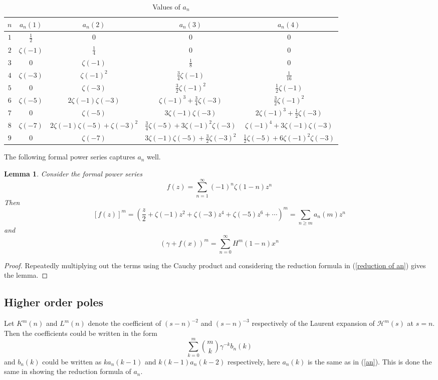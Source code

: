 \documentclass{article}
\newtheorem{lemma}[theorem]{Lemma}%
\begin{document}
\begin{table}[h]
\caption{Values of $a_n$}\vspace{3mm}\label{tab3}
\begin{tabular}{|c|c|c|c|c|} \hline 
    $n$ & $a_n(1)$ & $a_n(2)$ & $a_n(3)$ & $a_n(4)$ \\ \hline
   $1$&  $\frac{1}{2}$ &  0 & 0 & 0 \\ \hline   
   $2$&  $\zeta(-1)$ &  $\frac{1}{4}$ & 0 & 0 \\ \hline
   $3$&  0&  $\zeta(-1)$& $\frac{1}{8}$ & 0\\ \hline
   $4$&  $\zeta(-3)$ & $\zeta(-1)^2$ & $\frac{3}{4}\zeta(-1)$ & $\frac{1}{16}$\\ \hline
   $5$&  0& $\zeta(-3)$ & $\frac{3}{2}\zeta(-1)^2$& $\frac{1}{2}\zeta(-1)$ \\ \hline
   $6$&  $\zeta(-5)$ & $2\zeta(-1)\zeta(-3)$ & $\zeta(-1)^3+\frac{3}{4}\zeta(-3)$ & $\frac{3}{2}\zeta(-1)^2$ \\ \hline
   $7$&  0& $\zeta(-5)$ & $3\zeta(-1)\zeta(-3) $ & $2\zeta(-1)^3+\frac{1}{2}\zeta(-3)$\\ \hline
   $8$&  $\zeta(-7)$ & $2\zeta(-1)\zeta(-5)+\zeta(-3)^2$ & $\frac{3}{4}\zeta(-5)+3\zeta(-1)^2\zeta(-3)$ &$\zeta(-1)^4+3\zeta(-1)\zeta(-3)$ \\ \hline
   $9$&  0& $\zeta(-7)$ & $3\zeta(-1)\zeta(-5)+\frac{3}{2}\zeta(-3)^2$ & $\frac{1}{2}\zeta(-5)+6\zeta(-1)^2\zeta(-3)$\\ \hline 
\end{tabular}
\end{table}

The following formal power series captures $a_n$ well. 
\begin{lemma}\label{formal power series}
    Consider the formal power series \[f(z)=\sum_{n=1}^{\infty} (-1)^n \zeta(1-n)z^n\]
    Then \begin{equation}\label{generating function of a}
        [f(z)]^m =\left(\frac{z}{2}+\zeta(-1)z^2+\zeta(-3)z^4+\zeta(-5)z^6+\cdots\right)^m=\sum_{n\geq m} a_n(m)z^n
    \end{equation}
and \[(\gamma+ f(x))^m=\sum_{n=0}^{\infty} H^m(1-n) x^n\]
\end{lemma}
\begin{proof}
Repeatedly multiplying out the terms using the Cauchy product and considering the reduction formula in (\ref{reduction of an}) gives the lemma. \end{proof}
\subsection{Higher order poles}\par
Let $K^m(n)$ and $L^m(n)$ denote the coefficient of $(s-n)^{-2}$ and $(s-n)^{-3}$ respectively of the Laurent expansion of $\mathcal{H}^m(s)$ at $s=n$. Then the coefficients could be written in the form $$\sum_{k=0}^m \binom{m}{k}\gamma^{-k}b_{n}(k)$$
and $b_n(k)$ could be written as $ka_n(k-1)$ and $k(k-1)a_n(k-2)$ respectively, here $a_n(k)$ is the same as in (\ref{an}). This is done the same in showing the reduction formula of $a_n$.
\end{document}
